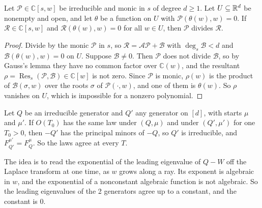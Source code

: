 \begin{lemma}\label{lem:graph}
Let $\mathcal P\in\mathbb C[s,w]$ be irreducible and monic in $s$ of degree $d\ge1$. Let
$U\subseteq\mathbb{R}^d$ be nonempty and open, and let $\theta$ be a function on $U$ with
$\mathcal P(\theta(w),w)=0$. If $\mathcal R\in\mathbb C[s,w]$ and $\mathcal R(\theta(w),w)=0$ for
all $w\in U$, then $\mathcal P$ divides $\mathcal R$.
\end{lemma}

\begin{proof}
Divide by the monic $\mathcal P$ in $s$, so $\mathcal R=\mathcal A\mathcal P+\mathcal B$ with
$\deg_s\mathcal B<d$ and $\mathcal B(\theta(w),w)=0$ on $U$. Suppose $\mathcal B\ne0$. Then
$\mathcal P$ does not divide $\mathcal B$, so by Gauss's lemma they have no common factor over
$\mathbb C(w)$, and the resultant $\rho=\operatorname{Res}_s(\mathcal P,\mathcal B)\in\mathbb C[w]$
is not zero. Since $\mathcal P$ is monic, $\rho(w)$ is the product of $\mathcal B(\sigma,w)$ over
the roots $\sigma$ of $\mathcal P(\cdot,w)$, and one of them is $\theta(w)$. So $\rho$ vanishes on
$U$, which is impossible for a nonzero polynomial.
\end{proof}

\begin{theorem}\label{thm:one-horizon}
Let $Q$ be an irreducible generator and $Q'$ any generator on $[d]$, with starts $\mu$ and $\mu'$.
If $O(T_0)$ has the same law under $(Q,\mu)$ and under $(Q',\mu')$ for one $T_0>0$, then $-Q'$
has the principal minors of $-Q$, so $Q'$ is irreducible, and $F^{\mu'}_{Q'}=F^\mu_Q$. So the laws
agree at every $T$.
\end{theorem}

The idea is to read the exponential of the leading eigenvalue of $Q-W$ off the Laplace
transform at one time, as $w$ grows along a ray. Its exponent is algebraic in $w$, and the
exponential of a nonconstant algebraic function is not algebraic. So the leading eigenvalues of
the 2 generators agree up to a constant, and the constant is $0$.

